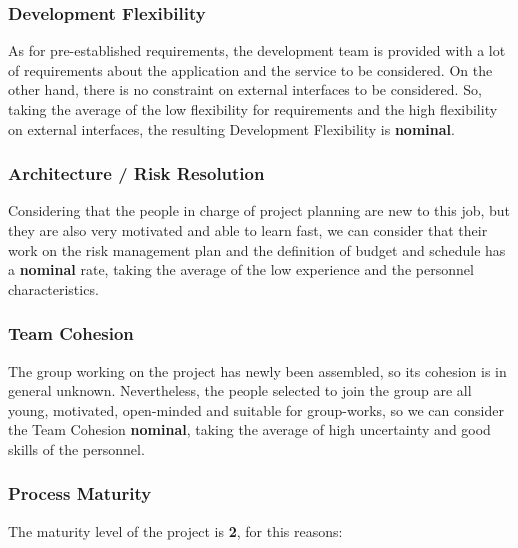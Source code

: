 \subsubsection{Development Flexibility}
As for pre-established requirements, the development team is provided with a lot of requirements about the application and the service to be considered. On the other hand, there is no constraint on external interfaces to be considered.
So, taking the average of the low flexibility for requirements and the high flexibility on external interfaces, the resulting Development Flexibility is \textbf{nominal}.

\subsubsection{Architecture / Risk Resolution}
Considering that the people in charge of project planning are new to this job, but they are also very motivated and able to learn fast, we can consider that their work on the risk management plan and the definition of budget and schedule has a \textbf{nominal} rate, taking the average of the low experience and the personnel characteristics.

\subsubsection{Team Cohesion}
The group working on the project has newly been assembled, so its cohesion is in general unknown. Nevertheless, the people selected to join the group are all young, motivated, open-minded and suitable for group-works, so we can consider the Team Cohesion \textbf{nominal}, taking the average of high uncertainty and good skills of the personnel.

\subsubsection{Process Maturity}
The maturity level of the project is \textbf{2}, for this reasons:

